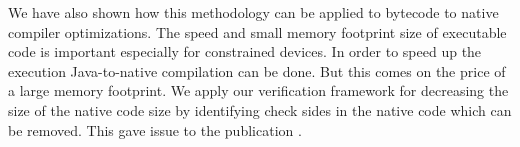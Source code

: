 We have also shown how this methodology  can be applied to  bytecode to native compiler optimizations. 
The speed and small memory footprint size of  executable code is important especially for constrained devices. 
In order to speed up the execution Java-to-native compilation can be done. But this comes on the price of a large memory footprint.
We apply our verification framework for decreasing the size of the native code size 
by identifying check sides in the native code which can be removed. This gave issue to the publication \cite{DBLP:conf/cardis/CourbotPGV06}. 
         










